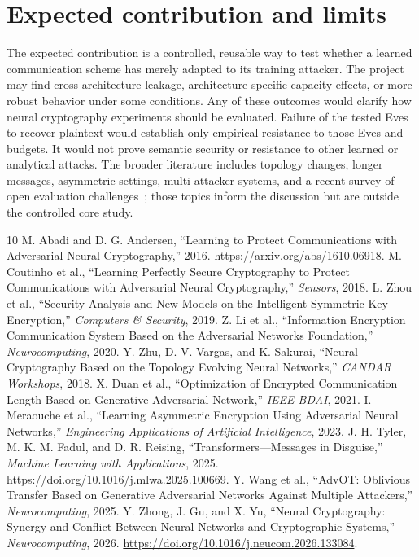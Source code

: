 \documentclass[10pt,letterpaper]{article}
\begin{document}
\section{Expected contribution and limits}
The expected contribution is a controlled, reusable way to test whether a learned communication scheme has merely adapted to its training attacker. The project may find cross-architecture leakage, architecture-specific capacity effects, or more robust behavior under some conditions. Any of these outcomes would clarify how neural cryptography experiments should be evaluated. Failure of the tested Eves to recover plaintext would establish only empirical resistance to those Eves and budgets. It would not prove semantic security or resistance to other learned or analytical attacks. The broader literature includes topology changes, longer messages, asymmetric settings, multi-attacker systems, and a recent survey of open evaluation challenges~\cite{zhu2018,duan2021,meraouche2023,wang2025,zhong2026}; those topics inform the discussion but are outside the controlled core study.

\vspace{-5pt}
\begin{thebibliography}{10}\small\setlength{\itemsep}{0pt}\setlength{\parskip}{0pt}
 M. Abadi and D. G. Andersen, ``Learning to Protect Communications with Adversarial Neural Cryptography,'' 2016. \url{https://arxiv.org/abs/1610.06918}.
 M. Coutinho et al., ``Learning Perfectly Secure Cryptography to Protect Communications with Adversarial Neural Cryptography,'' \emph{Sensors}, 2018.
 L. Zhou et al., ``Security Analysis and New Models on the Intelligent Symmetric Key Encryption,'' \emph{Computers \& Security}, 2019.
 Z. Li et al., ``Information Encryption Communication System Based on the Adversarial Networks Foundation,'' \emph{Neurocomputing}, 2020.
 Y. Zhu, D. V. Vargas, and K. Sakurai, ``Neural Cryptography Based on the Topology Evolving Neural Networks,'' \emph{CANDAR Workshops}, 2018.
 X. Duan et al., ``Optimization of Encrypted Communication Length Based on Generative Adversarial Network,'' \emph{IEEE BDAI}, 2021.
 I. Meraouche et al., ``Learning Asymmetric Encryption Using Adversarial Neural Networks,'' \emph{Engineering Applications of Artificial Intelligence}, 2023.
 J. H. Tyler, M. K. M. Fadul, and D. R. Reising, ``Transformers---Messages in Disguise,'' \emph{Machine Learning with Applications}, 2025. \url{https://doi.org/10.1016/j.mlwa.2025.100669}.
 Y. Wang et al., ``AdvOT: Oblivious Transfer Based on Generative Adversarial Networks Against Multiple Attackers,'' \emph{Neurocomputing}, 2025.
 Y. Zhong, J. Gu, and X. Yu, ``Neural Cryptography: Synergy and Conflict Between Neural Networks and Cryptographic Systems,'' \emph{Neurocomputing}, 2026. \url{https://doi.org/10.1016/j.neucom.2026.133084}.
\end{thebibliography}
\end{document}
